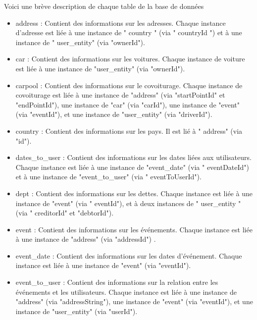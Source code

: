 Voici une brève description de chaque table de la base de données
\begin{itemize}
    \item address : Contient des informations sur les adresses.
    Chaque instance d'adresse est liée à une instance de " country " (via " countryId ") et à une instance de " user\_entity" (via "ownerId").\\
    \item car : Contient des informations sur les voitures.
    Chaque instance de voiture est liée à une instance de "user\_entity" (via "ownerId").\\
    \item carpool : Contient des informations sur le covoiturage.
    Chaque instance de covoiturage est liée à une instance de "address" (via "startPointId" et "endPointId"), une instance de "car" (via "carId"),
    une instance de "event" (via "eventId"), et une instance de "user\_entity" (via "driverId").\\
    \item country : Contient des informations sur les pays.
    Il est lié à " address" (via "id").\\
    \item  dates\_to\_user : Contient des informations sur les dates liées aux utilisateurs.
    Chaque instance est liée à une instance de "event\_date" (via " eventDateId") et à une instance de "event\_to\_user" (via " eventToUserId").\\
    \item dept : Contient des informations sur les dettes.
    Chaque instance est liée à une instance de "event" (via " eventId"), et à deux instances de " user\_entity " (via " creditorId" et "debtorId").\\
    \item event : Contient des informations sur les événements.
    Chaque instance est liée à une instance de "address" (via "addressId") .\\
    \item event\_date : Contient des informations sur les dates d'événement.
    Chaque instance est liée à une instance de "event" (via "eventId").\\
    \item event\_to\_user : Contient des informations sur la relation entre les événements et les utilisateurs.
    Chaque instance est liée à une instance de "address" (via "addressString"), une instance de "event" (via "eventId"), et une instance de "user\_entity" (via "userId").\\

\end{itemize}
